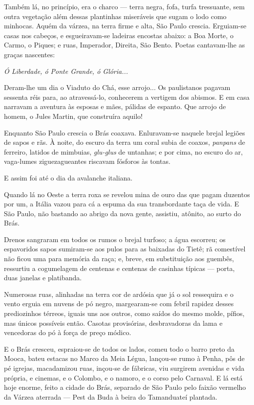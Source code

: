 Também lá, no princípio, era o charco --- terra negra, fofa, turfa
tressuante, sem outra vegetação além dessas plantinhas miseráveis que
sugam o lodo como minhocas. Aquém da várzea, na terra firme e alta, São
Paulo crescia. Erguiam-se casas nos cabeços, e esgueiravam-se ladeiras
encostas abaixo: a Boa Morte, o Carmo, o Piques; e ruas, Imperador,
Direita, São Bento. Poetas cantavam-lhe as graças nascentes:

\emph{Ó Liberdade, ó Ponte Grande, ó Glória...}

Deram-lhe um dia o Viaduto do Chá, esse arrojo... Os paulistanos pagavam
sessenta réis para, ao atravessá-lo, conhecerem a vertigem dos abismos.
E em casa narravam a aventura às esposas e mães, pálidas de espanto. Que
arrojo de homem, o Jules Martin, que construíra aquilo!

Enquanto São Paulo crescia o Brás coaxava. Enluravam-se naquele brejal
legiões de sapos e rãs. À noite, do escuro da terra um coral subia de
coaxos, \emph{panpans} de ferreiro, latidos de mimbuias, \emph{glu-glus}
de untanhas; e por cima, no escuro do ar, vaga-lumes ziguezagueantes
riscavam fósforos às tontas.

E assim foi até o dia da avalanche italiana.

Quando lá no Oeste a terra roxa se revelou mina de ouro das que pagam
duzentos por um, a Itália vazou para cá a espuma da sua transbordante
taça de vida. E São Paulo, não bastando ao abrigo da nova gente,
assistiu, atônito, ao surto do Brás.

Drenos sangraram em todos os rumos o brejal turfoso; a água escorreu; os
espavoridos sapos sumiram-se aos pulos para as baixadas do Tietê; rã
comestível não ficou uma para memória da raça; e, breve, em substituição
aos guembês, ressurtiu a cogumelagem de centenas e centenas de casinhas
típicas --- porta, duas janelas e platibanda.

Numerosas ruas, alinhadas na terra cor de ardósia que já o sol
ressequira e o vento erguia em nuvens de pó negro, margearam-se com
febril rapidez desses prediozinhos térreos, iguais uns aos outros, como
saídos do mesmo molde, pífios, mas únicos possíveis então. Casotas
provisórias, desbravadoras da lama e vencedoras do pó à força de preço
módico.

E o Brás cresceu, espraiou-se de todos os lados, comeu todo o barro
preto da Mooca, bateu estacas no Marco da Meia Légua, lançou-se rumo à
Penha, pôs de pé igrejas, macadamizou ruas, inçou-se de fábricas, viu
surgirem avenidas e vida própria, e cinemas, e o Colombo, e o namoro, e
o corso pelo Carnaval. E lá está hoje enorme, feito a cidade do Brás,
separado de São Paulo pelo faixão vermelho da Várzea aterrada --- Pest
da Buda à beira do Tamanduateí plantada.

